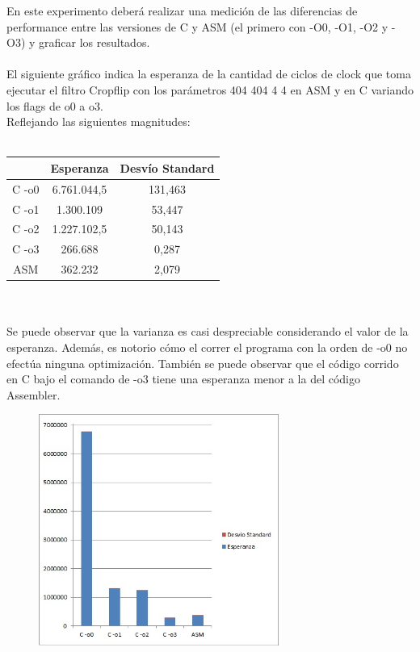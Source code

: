 En este experimento deberá realizar una medición de las diferencias de 
performance entre las versiones de C y ASM (el primero con -O0, -O1, -O2 y -O3) 
y graficar los resultados. \\
\\
El siguiente gr\'afico indica la esperanza de la cantidad de ciclos de clock que toma ejecutar el filtro Cropflip con los par\'ametros 404 404 4 4 en ASM y en C variando los flags de o0 a o3. \\
Reflejando las siguientes magnitudes: \\
\\
 \begin{tabular}[c]{|c|c|c|}
	\hline
		 & Esperanza & Desv\'io Standard\\
		\hline
C -o0 & 6.761.044,5 & 131,463 \\
\hline
C -o1 & 1.300.109 & 53,447 \\
\hline
C -o2 & 1.227.102,5 & 50,143\\
\hline
C -o3 & 266.688 & 0,287 \\
\hline
ASM & 362.232 & 2,079\\
\hline
	\end{tabular}\\\\
Se puede observar que la varianza es casi despreciable considerando el valor de la esperanza. Adem\'as, es notorio c\'omo el correr el programa con la orden de -o0 no efect\'ua ninguna optimizaci\'on. Tambi\'en se puede observar que el c\'odigo corrido en C bajo el comando de -o3 tiene una esperanza menor a la del c\'odigo Assembler.
\newpage
\begin{figure}
  \begin{center}
	\includegraphics[width=0.7\textwidth]{imagenes/14.jpg}
  \end{center}
\end{figure}
\newpage


